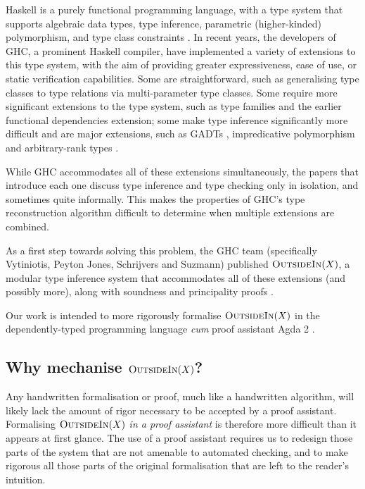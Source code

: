 \documentclass[a4paper]{jfp}
\newcommand{\outsidein}{\textsc{OutsideIn}(X)}
\begin{document}
Haskell is a purely functional programming language, with a type system that supports algebraic data types, type inference, parametric (higher-kinded)
polymorphism, and type class constraints \cite{Anonymous:2010we}. In recent years, the developers of GHC, a prominent Haskell compiler, have
implemented a variety of extensions to this type system, with the aim of providing greater expressiveness, ease of use, or static verification
capabilities. Some are straightforward, such as generalising type classes to type relations via multi-parameter type classes. Some require more
significant extensions to the type system, such as type families \cite{citeulike:9320233} and the earlier functional dependencies extension; some make
type inference significantly more difficult and are major extensions, such as GADTs \cite{Schrijvers:2009jg}, impredicative polymorphism and
arbitrary-rank types \cite{Jones:2007dr}.

While GHC accommodates all of these extensions simultaneously, the papers that introduce each one discuss type inference and type checking only in
isolation, and sometimes quite informally. This makes the properties of GHC's type reconstruction algorithm difficult to determine when multiple
extensions are combined.  

As a first step towards solving this problem, the GHC team (specifically Vytiniotis, Peyton Jones, Schrijvers and Suzmann) published $\outsidein$, a
modular type inference system that accommodates all of these extensions (and possibly more), along with soundness and principality proofs
\cite{Vytiniotis:2011:OMT:2139531.2139533}. 

Our work is intended to more rigorously formalise $\outsidein$ in the dependently-typed programming language \emph{cum} proof assistant Agda 2
\cite{conf/afp/norell08}.

\subsection{Why mechanise $\outsidein$?}

Any handwritten formalisation or proof, much like a handwritten algorithm, will likely lack the amount of rigor necessary to be accepted by a proof
assistant. Formalising $\outsidein$ \emph{in a proof assistant} is therefore more difficult than it appears at first glance. The use of a proof
assistant requires us to redesign those parts of the system that are not amenable to automated checking, and to make rigorous all those
parts of the original formalisation that are left to the reader's intuition.
\end{document}
